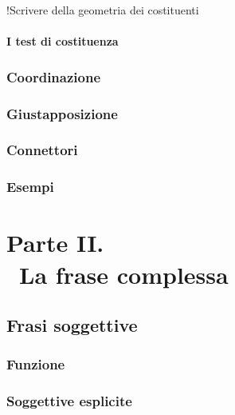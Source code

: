 \documentclass[a4paper,twoside,11pt,chapterprefix=false,bibliography=totocnumbered,listof=flat]{scrbook}
\begin{document}
!Scrivere della geometria dei costituenti

\hypertarget{i-test-di-costituenza}{%
\subsection{I test di costituenza}\label{i-test-di-costituenza}}

\hypertarget{coordinazione}{%
\section{Coordinazione}\label{coordinazione}}

\hypertarget{giustapposizione}{%
\section{Giustapposizione}\label{giustapposizione}}

\hypertarget{connettori}{%
\section{Connettori}\label{connettori}}

\hypertarget{esempi}{%
\section{Esempi}\label{esempi}}

\part*{Parte II. \\\ La frase complessa}

\hypertarget{frasi-soggettive}{%
\chapter{Frasi soggettive}\label{frasi-soggettive}}

\hypertarget{funzione}{%
\section{Funzione}\label{funzione}}

\hypertarget{soggettive-esplicite}{%
\section{Soggettive esplicite}\label{soggettive-esplicite}}
\end{document}
